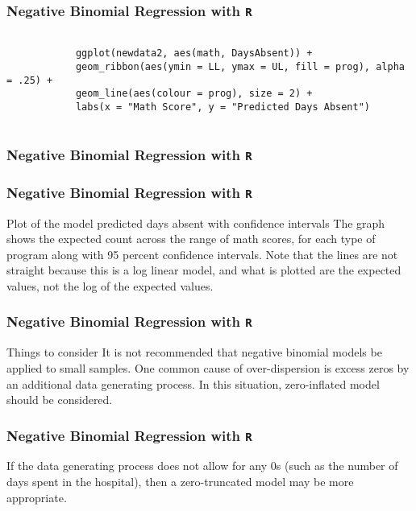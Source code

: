 \documentclass[00-GLMregslides.tex]{subfiles}
\begin{document}
	\begin{frame}[fragile]
		\frametitle{Negative Binomial Regression with \texttt{R} }
		\Large
		
		\begin{framed}
			\begin{verbatim}
			
			ggplot(newdata2, aes(math, DaysAbsent)) +
			geom_ribbon(aes(ymin = LL, ymax = UL, fill = prog), alpha = .25) +
			geom_line(aes(colour = prog), size = 2) +
			labs(x = "Math Score", y = "Predicted Days Absent")
			
			\end{verbatim}	
		\end{framed}
		
	\end{frame}
\begin{frame}[fragile]
	\frametitle{Negative Binomial Regression with \texttt{R} }
	\Large
	
	
\end{frame}
\begin{frame}[fragile]
	\frametitle{Negative Binomial Regression with \texttt{R} }
	\Large
	
	Plot of the model predicted days absent with confidence intervals
	The graph shows the expected count across the range of math scores, for each type of program along with 95 percent confidence intervals. Note that the lines are not straight because this is a log linear model, and what is plotted are the expected values, not the log of the expected values.
\end{frame}
\begin{frame}[fragile]
	\frametitle{Negative Binomial Regression with \texttt{R} }
	\Large
	
	Things to consider
	It is not recommended that negative binomial models be applied to small samples.
	One common cause of over-dispersion is excess zeros by an additional data generating process. In this situation, zero-inflated model should be considered.
\end{frame}
\begin{frame}[fragile]
	\frametitle{Negative Binomial Regression with \texttt{R} }
	\Large
	
	If the data generating process does not allow for any 0s (such as the number of days spent in the hospital), then a zero-truncated model may be more appropriate.
\end{frame}
\end{document}

